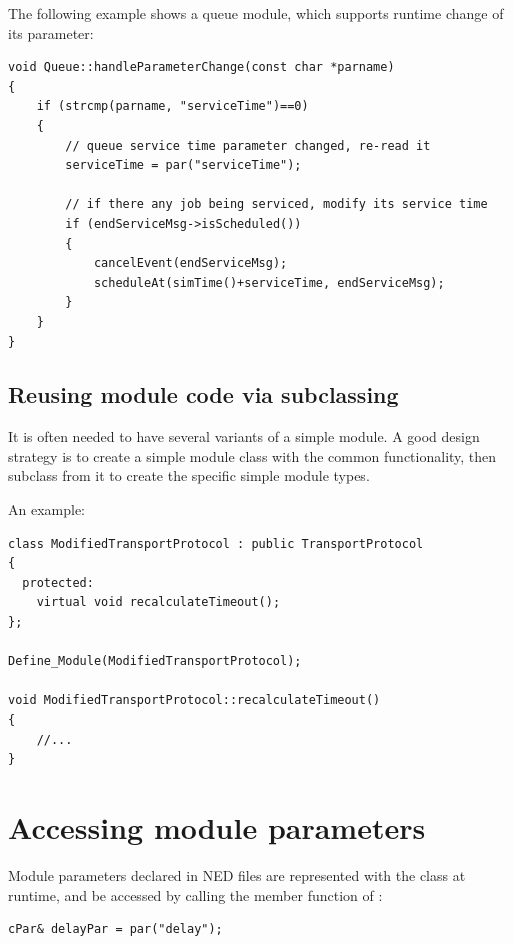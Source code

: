 The following example shows a queue module, which supports
runtime change of its  parameter:

\begin{verbatim}
void Queue::handleParameterChange(const char *parname)
{
    if (strcmp(parname, "serviceTime")==0)
    {
        // queue service time parameter changed, re-read it
        serviceTime = par("serviceTime");

        // if there any job being serviced, modify its service time
        if (endServiceMsg->isScheduled())
        {
            cancelEvent(endServiceMsg);
            scheduleAt(simTime()+serviceTime, endServiceMsg);
        }
    }
}
\end{verbatim}




\subsection{Reusing module code via subclassing}
\label{sec:simple-modules:module-subclassing}

It is often needed to have several variants of a simple module.
A good design strategy is to create a simple module class with
the common functionality, then subclass from it to create the
specific simple module types.


An example:

\begin{verbatim}
class ModifiedTransportProtocol : public TransportProtocol
{
  protected:
    virtual void recalculateTimeout();
};

Define_Module(ModifiedTransportProtocol);

void ModifiedTransportProtocol::recalculateTimeout()
{
    //...
}
\end{verbatim}




\section{Accessing module parameters}
\label{sec:simple-modules:parameters}

Module parameters declared in NED files are represented with the 
class at runtime, and be accessed
by calling the  member function of :

\begin{verbatim}
cPar& delayPar = par("delay");
\end{verbatim}

